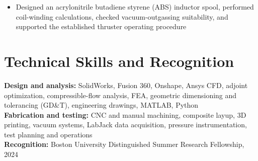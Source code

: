 \documentclass[letterpaper,11pt]{article}
\newcommand{\resumeItem}[1]{\item \small{#1}}
\newcommand{\resumeItemListStart}{
  \begin{itemize}[
    leftmargin=0.17in,
    label=\textbullet,
    itemsep=1.5pt,
    topsep=2pt,
    parsep=0pt,
    partopsep=0pt
  ]
}
\newcommand{\resumeItemListEnd}{
  \end{itemize}\vspace{3pt}
}
\begin{document}
\resumeItemListStart
  \resumeItem{
    Designed an acrylonitrile butadiene styrene (ABS) inductor spool,
    performed coil-winding calculations, checked vacuum-outgassing
    suitability, and supported the established thruster operating
    procedure
  }
\resumeItemListEnd

\section{Technical Skills and Recognition}

{\small
\textbf{Design and analysis:}
SolidWorks, Fusion 360, Onshape, Ansys CFD, adjoint optimization,
compressible-flow analysis, FEA, geometric dimensioning and
tolerancing (GD\&T), engineering drawings, MATLAB, Python\\
\textbf{Fabrication and testing:}
CNC and manual machining, composite layup, 3D printing, vacuum
systems, LabJack data acquisition, pressure instrumentation, test
planning and operations\\
\textbf{Recognition:}
Boston University Distinguished Summer Research Fellowship, 2024
}
\end{document}
